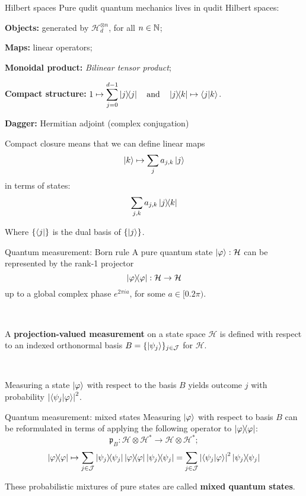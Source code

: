 \documentclass{beamer}
\begin{document}
\begin{frame}{Hilbert spaces}
Pure qudit quantum mechanics lives in qudit Hilbert spaces:

\begin{description}
\item \textbf{Objects:} generated by \(\mathcal{H}_d^{\otimes n}\), for all \(n\in\mathbb{N}\);
\item \textbf{Maps:} linear operators;
\item \textbf{Monoidal product:} \emph{Bilinear tensor product};
\item \textbf{Compact structure:}  \(\displaystyle
      1 \mapsto  \sum_{j=0}^{d-1} \dyad{j}{j}
      \qand
       \dyad{j}{k} \mapsto \bra{j}\ket{k}
    \).
\item \textbf{Dagger:} Hermitian adjoint (complex conjugation)
\end{description}


Compact closure means that we can define  linear maps
\[\ket{k}\mapsto \sum_{j} a_{j,k}\ket{j}\]
in terms of states:
\[\sum_{j,k} a_{j,k} \dyad{j}{k}\]


Where \(\{\bra{j}\}\) is the dual basis of \(\{\ket{j}\}\).

\end{frame}




\newcommand{\proj}{\mathfrak{p}}


\begin{frame}{Quantum measurement: Born rule}
A pure quantum state \(\ket{\varphi}:\mathcal H\) can be represented by the rank-1 projector
 \[\dyad{\phi}{\phi}:\mathcal H \to \mathcal H\]
 up to a global complex phase \(e^{2\pi i a}\), for some \(a\in[0.2\pi)\).

\

A \textbf{projection-valued measurement} on a state space \(\mathcal H\) is defined with respect to an indexed
orthonormal basis \(B=\{\ket{\psi_j}\}_{j \in \mathcal J}\) for  \(\mathcal{H}\).  

\

Measuring a state \(\ket{\varphi}\) with respect to the basis \(B\)  yields outcome \(j\) with probability \(\abs{\bra{\psi_j}\ket{\varphi}}^2\). 

\end{frame}

\begin{frame}{Quantum measurement: mixed states}
Measuring \(\ket{\varphi}\)  with respect to basis \(B\) can be reformulated in terms of applying the following operator to \(\dyad{\phi}{\phi}\):
\[
  \proj_B: \mathcal{H}\otimes \mathcal{H}^*\to  \mathcal{H}\otimes \mathcal{H}^*; 
\]
\[
  \dyad{\phi}{\phi}
  \mapsto \sum_{j\in \mathcal J} \dyad{\psi_j}{\psi_j}\dyad{\phi}{\phi} \dyad{\psi_j}{\psi_j}
  = \sum_{j\in \mathcal J} \abs{\bra{\psi_j}\ket{\phi}}^2\dyad{\psi_j}{\psi_j}
\]


These probabilistic mixtures of pure states are called \textbf{mixed quantum states}.
\end{frame}
\end{document}
